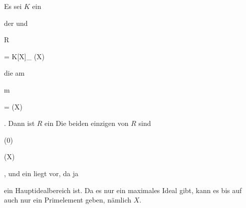 {


Es sei $K$ ein


 der
und


\mavergleichskette

{\vergleichskette

{R
}

{ = }{ K[X]_{ (X)}
}

{  }{
}

{    }{
}

{   }{
}

}
{}{}{}
die
am


\mavergleichskette

{\vergleichskette

{ {\mathfrak m}
}

{ = }{ (X)
}

{  }{
}

{    }{
}

{   }{
}

}
{}{}{.}
Dann ist $R$ ein
Die beiden einzigen
von $R$ sind


\mavergleichskette

{\vergleichskette

{(0)
}

{ \subset }{ (X)
}

{  }{
}

{    }{
}

{   }{
}

}
{}{}{,}
und ein
liegt vor, da ja

 ein Hauptidealbereich ist. Da es nur ein maximales Ideal gibt, kann es bis auf
auch nur ein Primelement geben, nämlich $X$.


}



